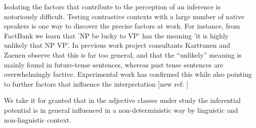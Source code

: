 \documentclass[10pt]{article}
\begin{document}
Isolating the factors that contribute to the perception of an inference is 
notoriously difficult. Testing contrastive contexts with a large number of native speakers is one way to discover the precise factors at work.
For instance, from FactBank we learn that 'NP be lucky to VP' has the meaning 'it is highly unlikely that NP VP'. In previous work project consultants Karttunen and Zaenen \cite{karttunen:2012b,zaenen+karttunen:2013} observe that this is far too general, and that the ``unlikely'' meaning is mainly found in future-tense sentences, whereas past tense sentences are overwhelmingly factive. Experimental work has confirmed this while also pointing to further factors that influence the interpretation [new ref:  \cite{Peters et al}]

%

We take it for granted that in the adjective classes under study the inferential potential is in general influenced in a non-deterministic way by linguistic and non-linguistic context.
\end{document}
